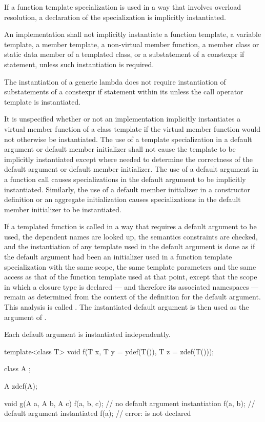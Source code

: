 \pnum
If a function template specialization is used in
a way that involves overload resolution,
a declaration of the specialization is implicitly instantiated.

\pnum
An implementation shall not implicitly instantiate a function template,
a variable template,
a member template, a non-virtual member function, a member class or
static data member of a templated class, or a substatement of a constexpr if
statement, unless such instantiation is required.
\begin{note}
The instantiation of a generic lambda
does not require instantiation of
substatements of a constexpr if statement
within its 
unless the call operator template is instantiated.
\end{note}
It is unspecified whether or not an implementation implicitly instantiates a
virtual member function of a class template if the virtual member function would
not otherwise be instantiated.
The use of a template specialization in
a default argument or default member initializer
shall not cause the template to be implicitly instantiated except
where needed to determine
the correctness of the default argument or default member initializer.
The use of a default argument in a
function call causes specializations in the default argument to be implicitly
instantiated.
Similarly, the use of a default member initializer
in a constructor definition or an aggregate initialization
causes specializations in the default member initializer to be instantiated.

\pnum
If a templated function
is called in a way that requires a default argument to be used,
the dependent names are looked up, the semantics constraints are checked,
and the instantiation of any template used in the default argument
is done as if the default argument had been
an initializer used in a function template specialization with the same scope,
the same template parameters and the same access as that of the function template
used at that point, except that the scope in which a closure type is
declared --- and therefore its associated namespaces ---
remain as determined from the context of the definition for the default
argument.
This analysis is called
.
The instantiated default argument is then used as the argument of
.

\pnum
Each default argument is instantiated independently.
\begin{example}
\begin{codeblock}
template<class T> void f(T x, T y = ydef(T()), T z = zdef(T()));

class  A { };

A zdef(A);

void g(A a, A b, A c) {
  f(a, b, c);       // no default argument instantiation
  f(a, b);          // default argument  instantiated
  f(a);             // error:  is not declared
}
\end{codeblock}
\end{example}


